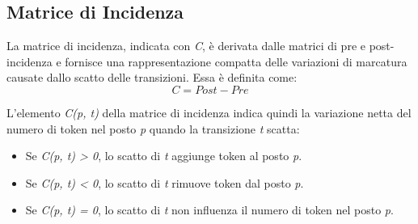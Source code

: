 \subsection{Matrice di Incidenza}
La matrice di incidenza, indicata con \textit{C}, è derivata dalle matrici di pre e post-incidenza e fornisce una rappresentazione compatta delle variazioni di marcatura causate dallo scatto delle transizioni. Essa è definita come:
\begin{equation}
    C = Post - Pre
    \label{eq:incidence_matrix}
\end{equation}

L'elemento \textit{C(p, t)} della matrice di incidenza indica quindi la variazione netta del numero di token nel posto \textit{p} quando la transizione \textit{t} scatta:

\begin{itemize}
    \item Se \textit{C(p, t) > 0}, lo scatto di \textit{t} aggiunge token al posto \textit{p}.
    \item Se \textit{C(p, t) < 0}, lo scatto di \textit{t} rimuove token dal posto \textit{p}.
    \item Se \textit{C(p, t) = 0}, lo scatto di \textit{t} non influenza il numero di token nel posto \textit{p}.
\end{itemize}